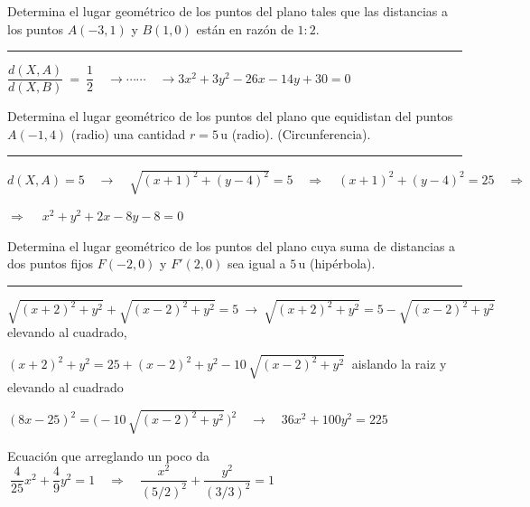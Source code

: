 \begin{miejercicio}

Determina el lugar geométrico de los puntos del plano tales que las distancias a los puntos $A(-3,1)$ y $B(1,0)$ están en razón de $1:2$.

\rule{250pt}{0.5pt}

\vspace{2mm} $\dfrac{d(X,A)}{d(X,B)} \ = \ \dfrac 1 2 \quad \to \cdots \cdots \quad \to 3x^2+3y^2-26x-14y+30=0$
	
\end{miejercicio}

\begin{miejercicio}

Determina el lugar geométrico de los puntos del plano que equidistan del puntos $A(-1,4)$ (radio) una cantidad $r=5\, \mathrm{u}$ (radio). (Circunferencia).

\rule{250pt}{0.5pt}

\vspace{2mm} $d(X,A)=5 \quad \to \quad \sqrt{(x+1)^2+(y-4)^2}=5 \quad \Rightarrow \quad (x+1)^2+(y-4)^2=25 \quad \Rightarrow $

\vspace{2mm} $\Rightarrow  \quad \ x^2+y^2+2x-8y-8=0$
	
\end{miejercicio}

\begin{miejercicio}

Determina el lugar geométrico de los puntos del plano cuya suma de distancias a dos puntos fijos $F(-2,0)$ y $F'(2,0)$ sea igual a $5\, \mathrm{u}$ (hipérbola).

\rule{250pt}{0.5pt}

\vspace{2mm} $\sqrt{(x+2)^2+y^2}+\sqrt{(x-2)^2+y^2}=5 \ \to \ 
\sqrt{(x+2)^2+y^2}=5-\sqrt{(x-2)^2+y^2}\ $ elevando al cuadrado,

\vspace{2mm} $(x+2)^2+y^2=25+(x-2)^2+y^2-10\, \sqrt{(x-2)^2+y^2}\ $ aislando la raiz y elevando al cuadrado

\vspace{2mm} $(8x-25)^2=\big(-10\, \sqrt{(x-2)^2+y^2}\, \big)^2 \quad \to \quad
 36x^2+100y^2=225$
 
 \vspace{2mm} Ecuación que arreglando un poco da $\ \dfrac{4}{25}	x^2 + \dfrac 4 9 y^2 = 1 \quad \Rightarrow \quad \dfrac{x^2}{(5/2)^2}+\dfrac{y^2}{(3/3)^2}=1$
 
\end{miejercicio}

